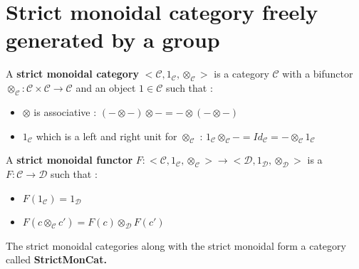 \section{Strict monoidal category freely generated by a group}

\begin{defn}
    A \textbf{strict monoidal category}\cite{lane_1971} $\big<\mathcal{C},1_\mathcal{C},\otimes_\mathcal{C}\big>$ is a category $\mathcal{C}$ with a bifunctor $\otimes_\mathcal{C} : \mathcal{C}\times\mathcal{C} \rightarrow \mathcal{C}$ and an object $1\in\mathcal{C}$ such that :
    \begin{itemize}
        \item $\otimes$ is associative : $(-\otimes-)\otimes - = - \otimes (-\otimes-)$
        \item $1_\mathcal{C}$ which is a left and right unit for $\otimes_\mathcal{C}$ : $1_\mathcal{C}\otimes_\mathcal{C} - = Id_{\mathcal{C}} = - \otimes_\mathcal{C} 1_\mathcal{C}$
    \end{itemize}
    \label{strict-mon}
\end{defn}

\begin{defn}
    A \textbf{strict monoidal functor}
    $F : \big<\mathcal{C},1_\mathcal{C},\otimes_\mathcal{C}\big> \rightarrow \big<\mathcal{D},1_\mathcal{D},\otimes_\mathcal{D}\big>$
    is a $F : \mathcal{C} \rightarrow \mathcal{D}$ such that :
    \begin{itemize}
        \item $F(1_\mathcal{C}) = 1_\mathcal{D}$
        \item $F(c\otimes_\mathcal{C} c') = F(c)\otimes_\mathcal{D}F(c') $
    \end{itemize}
    \label{strict-mon_func}
\end{defn}

\begin{defn}[StrictMonCat]
    The strict monoidal categories along with the strict monoidal form a category called \bf StrictMonCat\cite{katsumata_2014}.
    \label{SrictMonCat}
\end{defn}

